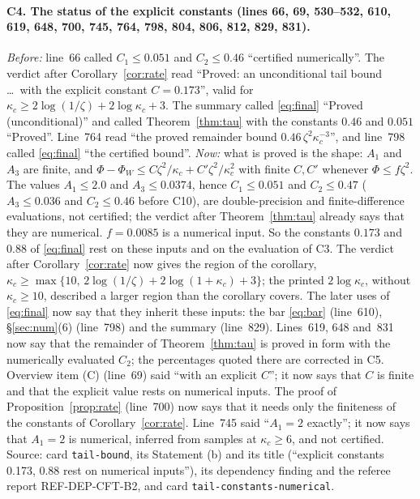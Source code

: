 \documentclass[11pt]{article}
\begin{document}
\paragraph{C4. The status of the explicit constants (lines 66, 69, 530--532, 610, 619, 648, 700,
745, 764, 798, 804, 806, 812, 829, 831).}
\emph{Before:} line~66 called $C_1\le0.051$ and $C_2\le0.46$ ``certified numerically''.  The verdict
after Corollary~\ref{cor:rate} read ``Proved: an unconditional tail bound \ldots\ with the explicit
constant $C=0.173$'', valid for $\kappa_c\ge2\log(1/\zeta)+2\log\kappa_c+3$.  The summary called
\eqref{eq:final} ``Proved (unconditional)'' and called Theorem~\ref{thm:tau} with the constants $0.46$
and $0.051$ ``Proved''.  Line~764 read ``the proved remainder bound $0.46\,\zeta^2\kappa_c^{-3}$'',
and line~798 called \eqref{eq:final} ``the certified bound''.
\emph{Now:} what is proved is the shape: $A_1$ and $A_3$ are finite, and
$\Phi-\Phi_W\le C\zeta^2/\kappa_c+C'\zeta^2/\kappa_c^2$ with finite $C,C'$ whenever $\Phi\le f\zeta^2$.
The values $A_1\le2.0$ and $A_3\le0.0374$, hence $C_1\le0.051$ and $C_2\le0.47$ ($A_3\le0.036$ and
$C_2\le0.46$ before C10), are double-precision and finite-difference evaluations, not certified; the verdict after Theorem~\ref{thm:tau} already says
that they are numerical.  $f=0.0085$ is a numerical input.  So the constants $0.173$ and $0.88$ of
\eqref{eq:final} rest on these inputs and on the evaluation of C3.  The verdict after
Corollary~\ref{cor:rate} now gives the region of the corollary,
$\kappa_c\ge\max\{10,\,2\log(1/\zeta)+2\log(1+\kappa_c)+3\}$; the printed $2\log\kappa_c$, without
$\kappa_c\ge10$, described a larger region than the corollary covers.  The later uses of
\eqref{eq:final} now say that they inherit these inputs: the bar \eqref{eq:bar} (line~610),
\S\ref{sec:num}(6) (line~798) and the summary (line~829).  Lines~619, 648 and~831 now say that the
remainder of Theorem~\ref{thm:tau} is proved in form with the numerically evaluated $C_2$; the
percentages quoted there are corrected in C5.  Overview item (C) (line~69) said ``with an explicit
$C$''; it now says that $C$ is finite and that the explicit value rests on numerical inputs.  The
proof of Proposition~\ref{prop:rate} (line~700) now says that it needs only the finiteness of the
constants of Corollary~\ref{cor:rate}.  Line~745 said ``$A_1=2$ exactly''; it now says that
$A_1=2$ is numerical, inferred from samples at $\kappa_c\ge6$, and not certified.
Source: card \texttt{tail-bound}, its Statement (b) and its title (``explicit constants 0.173, 0.88
rest on numerical inputs''), its dependency finding and the referee report REF-DEP-CFT-B2, and card
\texttt{tail-constants-numerical}.
\end{document}
